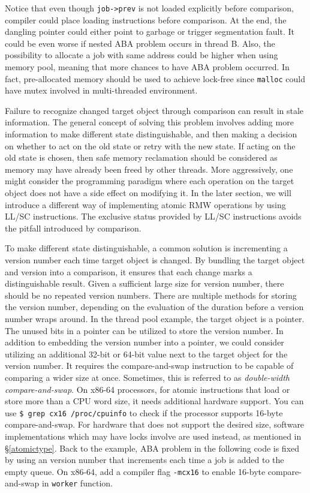\documentclass[fontsize=10pt, oneside]{scrartcl}
\newcommand{\monobox}[1]{\mbox{\texttt{#1}}}
\newcommand{\introduce}[1]{\textit{#1}}
\newcommand{\secref}[1]{\hyperref[#1]{\textsc{\S}\ref*{#1}}}
\begin{document}
Notice that even though \monobox{job->prev} is not loaded explicitly before comparison, compiler could place loading instructions before comparison. 
At the end, the dangling pointer could either point to garbage or trigger segmentation fault.
It could be even worse if nested ABA problem occurs in thread B.
Also, the possibility to allocate a job with same address could be higher when using memory pool, meaning that more chances to have ABA problem occurred.
In fact, pre-allocated memory should be used to achieve lock-free since \monobox{malloc} could have mutex involved in multi-threaded environment.

Failure to recognize changed target object through comparison can result in stale information.
The general concept of solving this problem involves adding more information to make different state distinguishable, and then making a decision on whether to act on the old state or retry with the new state.
If acting on the old state is chosen, then safe memory reclamation should be considered as memory may have already been freed by other threads.
More aggressively, one might consider the programming paradigm where each operation on the target object does not have a side effect on modifying it.
In the later section, we will introduce a different way of implementing atomic \textsc{RMW} operations by using LL/SC instructions. The exclusive status provided by LL/SC instructions avoids the pitfall introduced by comparison.

To make different state distinguishable, a common solution is incrementing a version number each time target object is changed.
By bundling the target object and version into a comparison, it ensures that each change marks a distinguishable result.
Given a sufficient large size for version number, there should be no repeated version numbers.
There are multiple methods for storing the version number, depending on the evaluation of the duration before a version number wraps around.
In the thread pool example, the target object is a pointer. The unused bits in a pointer can be utilized to store the version number.
In addition to embedding the version number into a pointer, we could consider utilizing an additional 32-bit or 64-bit value next to the target object for the version number.
It requires the compare-and-swap instruction to be capable of comparing a wider size at once.
Sometimes, this is referred to as \introduce{double-width compare-and-swap}.
On x86-64 processors, for atomic instructions that load or store more than a CPU word size, it needs additional hardware support.
You can use \monobox{\$ grep cx16 /proc/cpuinfo} to check if the processor supports 16-byte compare-and-swap.
For hardware that does not support the desired size, software implementations which may have locks involve are used instead, as mentioned in \secref{atomictype}.
Back to the example, ABA problem in the following code is fixed by using an version number that increments each time a job is added to the empty queue. On x86-64, add a compiler flag \monobox{-mcx16} to enable 16-byte compare-and-swap in \monobox{worker} function.
\end{document}
